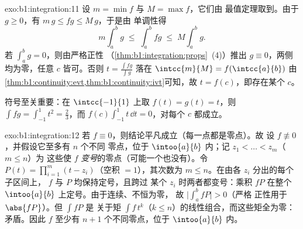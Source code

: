 \begin{solution}{exo:b1:integration:11}
设 $m = \min f$ 与 $M = \max f$，它们由
最值定理取到。由于 $g \geq 0$，有 $m\,g \leq fg \leq M\,g$，于是由
单调性得
\[
m \int_a^b g \;\leq\; \int_a^b fg \;\leq\; M \int_a^b g .
\]
若 $\int_a^b g = 0$，则由严格正性
（\cref{thm:b1:integration:props}~(4)）推出 $g \equiv 0$，两侧
均为零，任意 $c$ 皆可。否则 $t = \frac{\int
fg}{\int g}$ 落在 $\intcc{m}{M} = f(\intcc{a}{b})$
由\cref{thm:b1:continuity:evt,thm:b1:continuity:ivt}可知，故 $t =
f(c)$，即存在某个 $c$。

符号至关重要：在 $\intcc{-1}{1}$ 上取 $f(t) = g(t) = t$，则 $\int
fg = \int_{-1}^1 t^2 = \frac23$，而 $f(c)\int_{-1}^1 t\,\dd t
= 0$，对每个 $c$ 都成立。
\end{solution}

\begin{solution}{exo:b1:integration:12}
若 $f \equiv 0$，则结论平凡成立（每一点都是零点）。故
设 $f \not\equiv 0$，并假设它至多有 $n$ 个不同
零点，位于 $\intoo{a}{b}$ 内；记 $z_1 < \dots < z_m$（$m \leq n$）为
这些使 $f$ \emph{变号}的零点（可能一个也没有）。令
$P(t) = \prod_{i=1}^{m}(t - z_i)$（空积 $= 1$），其次数为
$m \leq n$。在由各 $z_i$ 分出的每个子区间上，
$f$ 与 $P$ 均保持定号，且跨过
某个 $z_i$ 时两者都变号：乘积 $fP$ 在整个
$\intoo{a}{b}$ 上定号。由于连续、不恒为零，
故 $\bigl|\int_a^b fP\bigr| > 0$（严格
正性用于 $\abs{fP}$）。但 $\int f P$ 是
关于矩 $\int f\,t^k$（$k \leq n$）的线性组合，而这些矩全为零：
矛盾。因此 $f$ 至少有 $n + 1$ 个不同零点，位于
$\intoo{a}{b}$ 内。
\end{solution}

